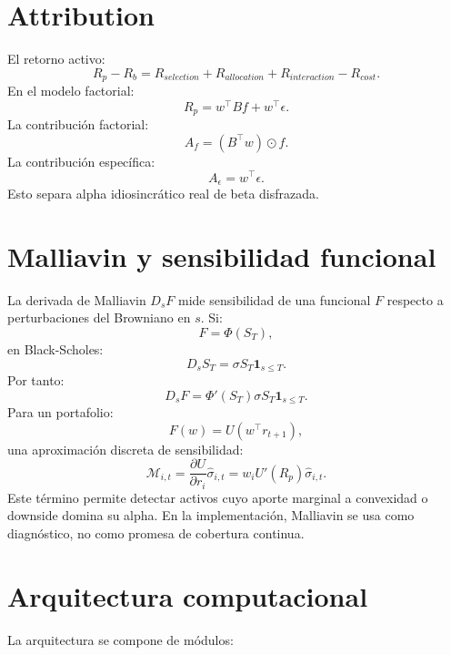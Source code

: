 \documentclass[11pt,letterpaper]{article}
\newcommand{\1}{\mathbf{1}}
\begin{document}
\newpage
\section{Attribution}

El retorno activo:
\[
    R_p-R_b
    =
    R_{selection}
    +
    R_{allocation}
    +
    R_{interaction}
    -
    R_{cost}.
\]
En el modelo factorial:
\[
    R_p
    =
    w^\top B f
    +
    w^\top \epsilon.
\]
La contribución factorial:
\[
    A_f = (B^\top w)\odot f.
\]
La contribución específica:
\[
    A_\epsilon=w^\top\epsilon.
\]
Esto separa alpha idiosincrático real de beta disfrazada.

\section{Malliavin y sensibilidad funcional}

La derivada de Malliavin \(D_sF\) mide sensibilidad de una funcional \(F\) respecto a perturbaciones del Browniano en \(s\). Si:
\[
    F = \Phi(S_T),
\]
en Black-Scholes:
\[
    D_sS_T
    =
    \sigma S_T\1_{s\le T}.
\]
Por tanto:
\[
    D_sF
    =
    \Phi'(S_T)\sigma S_T\1_{s\le T}.
\]
Para un portafolio:
\[
    F(w)=U(w^\top r_{t+1}),
\]
una aproximación discreta de sensibilidad:
\[
    \mathcal{M}_{i,t}
    =
    \frac{\partial U}{\partial r_i}
    \hat\sigma_{i,t}
    =
    w_i U'(R_p)\hat\sigma_{i,t}.
\]
Este término permite detectar activos cuyo aporte marginal a convexidad o downside domina su alpha. En la implementación, Malliavin se usa como diagnóstico, no como promesa de cobertura continua.

\newpage
\section{Arquitectura computacional}

La arquitectura se compone de módulos:
\end{document}
